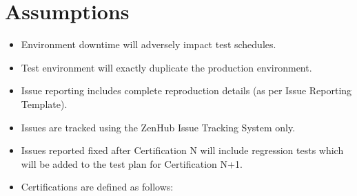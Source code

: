 \documentclass[letterpaper,10pt,english,openany,oneside]{sphinxmanual}
\begin{document}
\section{Assumptions}
\label{\detokenize{test_plan/strategy:assumptions}}
\begin{itemize}
\item {} 
Environment downtime will adversely impact test schedules.

\item {} 
Test environment will exactly duplicate the production environment.

\item {} 
Issue reporting includes complete reproduction details (as per Issue Reporting Template).

\item {} 
Issues are tracked using the ZenHub Issue Tracking System only.

\item {} 
Issues reported fixed after Certification N will include regression tests which will be added to the test plan for Certification N+1.

\end{itemize}

\begin{itemize}
\item {} 
Certifications are defined as follows:

\end{itemize}
\end{document}
